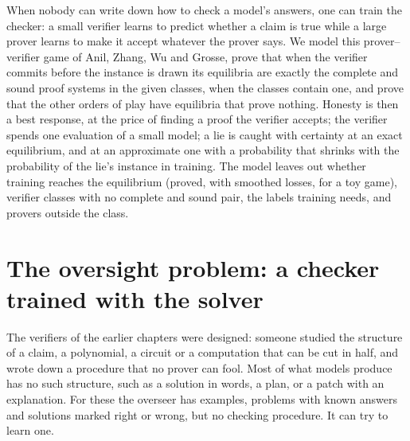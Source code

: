 \newcommand{\pvgrej}{v_{\mathrm{rej}}}
\newcommand{\pvgacc}{v_{\mathrm{acc}}}
\newcommand{\pvgBR}{\mathrm{BR}}

\begin{refsection}

\begin{chaptersummary}
When nobody can write down how to check a model's answers, one can train the checker: a small verifier learns to predict whether a claim is true while a large prover learns to make it accept whatever the prover says. We model this prover--verifier game of Anil, Zhang, Wu and Grosse, prove that when the verifier commits before the instance is drawn its equilibria are exactly the complete and sound proof systems in the given classes, when the classes contain one, and prove that the other orders of play have equilibria that prove nothing. Honesty is then a best response, at the price of finding a proof the verifier accepts; the verifier spends one evaluation of a small model; a lie is caught with certainty at an exact equilibrium, and at an approximate one with a probability that shrinks with the probability of the lie's instance in training. The model leaves out whether training reaches the equilibrium (proved, with smoothed losses, for a toy game), verifier classes with no complete and sound pair, the labels training needs, and provers outside the class.
\end{chaptersummary}

\section{The oversight problem: a checker trained with the solver}\label{sec:pvg:problem}

The verifiers of the earlier chapters were designed: someone studied the structure of a claim, a polynomial, a circuit or a computation that can be cut in half, and wrote down a procedure that no prover can fool. Most of what models produce has no such structure, such as a solution in words, a plan, or a patch with an explanation. For these the overseer has examples, problems with known answers and solutions marked right or wrong, but no checking procedure. It can try to learn one.


\end{refsection}
